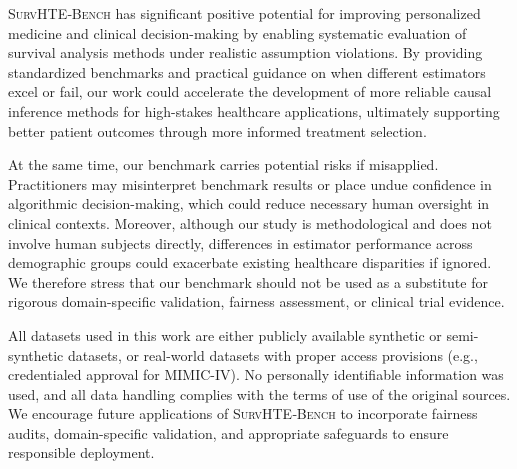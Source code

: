  \label{ch04:app:ethics-statement}

\textsc{SurvHTE‐Bench} has significant positive potential for improving personalized medicine and clinical decision-making by enabling systematic evaluation of survival analysis methods under realistic assumption violations. By providing standardized benchmarks and practical guidance on when different estimators excel or fail, our work could accelerate the development of more reliable causal inference methods for high-stakes healthcare applications, ultimately supporting better patient outcomes through more informed treatment selection.

At the same time, our benchmark carries potential risks if misapplied.
Practitioners may misinterpret benchmark results or place undue confidence in algorithmic decision-making, which could reduce necessary human oversight in clinical contexts.
Moreover, although our study is methodological and does not involve human subjects directly, differences in estimator performance across demographic groups could exacerbate existing healthcare disparities if ignored.
We therefore stress that our benchmark should not be used as a substitute for rigorous domain-specific validation, fairness assessment, or clinical trial evidence. 

All datasets used in this work are either publicly available synthetic or semi-synthetic datasets, or real-world datasets with proper access provisions (e.g., credentialed approval for MIMIC-IV).
No personally identifiable information was used, and all data handling complies with the terms of use of the original sources.
We encourage future applications of \textsc{SurvHTE‐Bench} to incorporate fairness audits, domain-specific validation, and appropriate safeguards to ensure responsible deployment.


